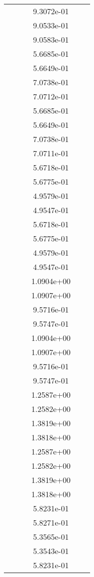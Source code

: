 \begin{xltabular}{\textwidth}{r|rS[table-format=1.3e+2]S[table-format=1.4e+2]S[table-format=1.4e+2]S[table-format=-1.5]}
&  &  & 9.3072e-01 & & \\
&  &  & 9.0533e-01 & & \\
&  &  & 9.0583e-01 & & \\
&  &  & 5.6685e-01 & & \\
&  &  & 5.6649e-01 & & \\
&  &  & 7.0738e-01 & & \\
&  &  & 7.0712e-01 & & \\
&  &  & 5.6685e-01 & & \\
&  &  & 5.6649e-01 & & \\
&  &  & 7.0738e-01 & & \\
&  &  & 7.0711e-01 & & \\
&  &  & 5.6718e-01 & & \\
&  &  & 5.6775e-01 & & \\
&  &  & 4.9579e-01 & & \\
&  &  & 4.9547e-01 & & \\
&  &  & 5.6718e-01 & & \\
&  &  & 5.6775e-01 & & \\
&  &  & 4.9579e-01 & & \\
&  &  & 4.9547e-01 & & \\
&  &  & 1.0904e+00 & & \\
&  &  & 1.0907e+00 & & \\
&  &  & 9.5716e-01 & & \\
&  &  & 9.5747e-01 & & \\
&  &  & 1.0904e+00 & & \\
&  &  & 1.0907e+00 & & \\
&  &  & 9.5716e-01 & & \\
&  &  & 9.5747e-01 & & \\
&  &  & 1.2587e+00 & & \\
&  &  & 1.2582e+00 & & \\
&  &  & 1.3819e+00 & & \\
&  &  & 1.3818e+00 & & \\
&  &  & 1.2587e+00 & & \\
&  &  & 1.2582e+00 & & \\
&  &  & 1.3819e+00 & & \\
&  &  & 1.3818e+00 & & \\
&  &  & 5.8231e-01 & & \\
&  &  & 5.8271e-01 & & \\
&  &  & 5.3565e-01 & & \\
&  &  & 5.3543e-01 & & \\
&  &  & 5.8231e-01 & & \\

\end{xltabular}
